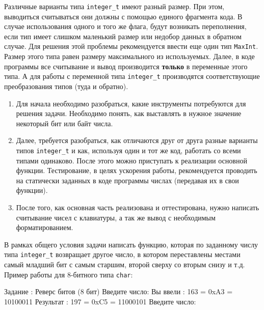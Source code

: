 Различные варианты типа \texttt{integer\_t} имеют разный размер. При этом, выводиться считываться они должны с помощью единого фрагмента кода. В случае использования одного и того же флага, будут возникать переполнения, если тип имеет слишком маленький размер или недобор данных в обратном случае. Для решения этой проблемы рекомендуется ввести еще один тип \texttt{MaxInt}. Размер этого типа равен размеру максимального из используемых. Далее, в коде программы все считывание и вывод производится \textbf{только} в переменные этого типа. А для работы с переменной типа \texttt{integer\_t} производятся соответствующие преобразования типов (туда и обратно).
\zzsectionPLAN


\begin{enumerate}
\item Для начала необходимо разобраться, какие инструменты потребуются для решения задачи. Необходимо понять, как выставлять в нужное значение некоторый бит или байт числа.
\item Далее, требуется разобраться, как отличаются друг от друга разные варианты типов \texttt{integer\_t} и как, используя один и тот же код, работать со всеми типами одинаково. После этого можно приступать к реализации основной функции. Тестирование, в целях ускорения работы, рекомендуется проводить на статически заданных в коде программы числах (передавая их в свои функции).
\item После того, как основная часть реализована и оттестирована, нужно написать считывание чисел с клавиатуры, а так же вывод с необходимым форматированием. 
\end{enumerate}


\zzsectionVARIATIONS


\begin{zztask}
В рамках общего условия задачи написать функцию, которая по заданному
числу типа \texttt{integer\_t} возвращает другое число, в котором переставлены местами
самый младший бит с самым старшим, второй сверху со вторым снизу и т.д.
Пример работы для 8-битного типа \texttt{char}:
\begin{zzoutput}
  Задание \thezztask: Реверс битов (8 бит)
  Введите число: 
  Вы ввели  :  163 = 0xA3 = 10100011
  Результат :  197 = 0xC5 = 11000101
  Введите число: \zzuser{ }
\end{zzoutput}
\end{zztask}

